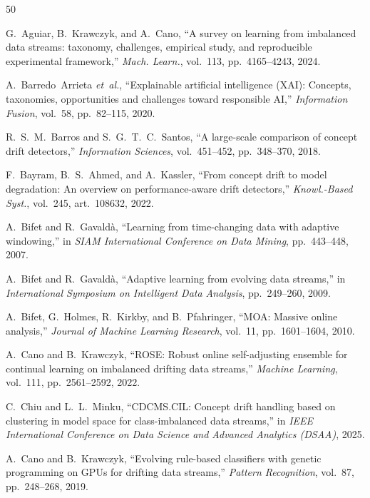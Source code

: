 \documentclass[lettersize,journal]{IEEEtran}
\begin{document}

\begin{thebibliography}{50}

G.~Aguiar, B.~Krawczyk, and A.~Cano, ``A survey on learning from imbalanced data streams: taxonomy, challenges, empirical study, and reproducible experimental framework,'' \textit{Mach. Learn.}, vol.~113, pp.~4165--4243, 2024.

A.~Barredo~Arrieta \textit{et~al.}, ``Explainable artificial intelligence (XAI): Concepts, taxonomies, opportunities and challenges toward responsible AI,'' \textit{Information Fusion}, vol.~58, pp.~82--115, 2020.

R.~S.~M.~Barros and S.~G.~T.~C.~Santos, ``A large-scale comparison of concept drift detectors,'' \textit{Information Sciences}, vol.~451--452, pp.~348--370, 2018.

F.~Bayram, B.~S.~Ahmed, and A.~Kassler, ``From concept drift to model degradation: An overview on performance-aware drift detectors,'' \textit{Knowl.-Based Syst.}, vol.~245, art.~108632, 2022.

A.~Bifet and R.~Gavald\`{a}, ``Learning from time-changing data with adaptive windowing,'' in \textit{SIAM International Conference on Data Mining}, pp.~443--448, 2007.

A.~Bifet and R.~Gavald\`{a}, ``Adaptive learning from evolving data streams,'' in \textit{International Symposium on Intelligent Data Analysis}, pp.~249--260, 2009.

A.~Bifet, G.~Holmes, R.~Kirkby, and B.~Pfahringer, ``MOA: Massive online analysis,'' \textit{Journal of Machine Learning Research}, vol.~11, pp.~1601--1604, 2010.

A.~Cano and B.~Krawczyk, ``ROSE: Robust online self-adjusting ensemble for continual learning on imbalanced drifting data streams,'' \textit{Machine Learning}, vol.~111, pp.~2561--2592, 2022.

C.~Chiu and L.~L.~Minku, ``CDCMS.CIL: Concept drift handling based on clustering in model space for class-imbalanced data streams,'' in \textit{IEEE International Conference on Data Science and Advanced Analytics (DSAA)}, 2025.

A.~Cano and B.~Krawczyk, ``Evolving rule-based classifiers with genetic programming on GPUs for drifting data streams,'' \textit{Pattern Recognition}, vol.~87, pp.~248--268, 2019.


\end{thebibliography}
\end{document}
